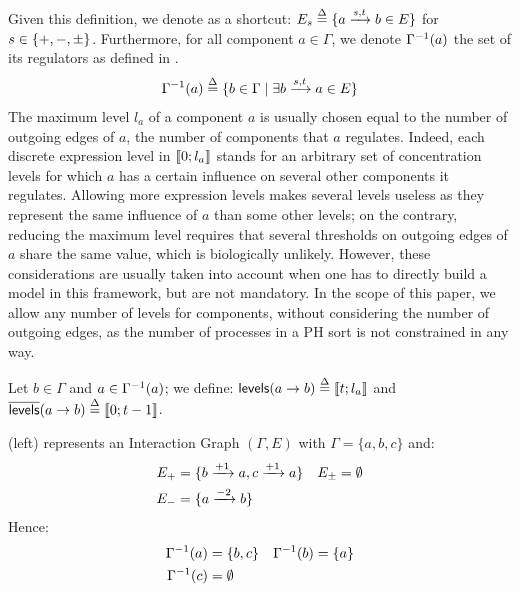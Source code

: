 Given this definition, we denote as a shortcut:
$E_s \stackrel{\Delta}= \{ a \xrightarrow{s, t} b \in E \}$ for $s \in \{ +, -, \pm \}$.
Furthermore, for all component $a \in \Gamma$, we denote $\Gamma^{-1}(a)$ the set of its regulators as defined in .
\begin{align}
\label{eq:grn-regulators}
  \Gamma^{-1}(a) \stackrel{\Delta}= \{ b\in\Gamma\mid \exists b \xrightarrow{s, t} a \in E \}
\end{align}
The maximum level $l_a$ of a component $a$ is usually chosen equal to the number of outgoing edges of $a$, \ie the number of components that $a$ regulates.
Indeed, each discrete expression level in $\llbracket 0 ; l_a \rrbracket$ stands for an arbitrary set of concentration levels for which $a$ has a certain influence on several other components it regulates.
Allowing more expression levels makes several levels useless as they represent the same influence of $a$ than some other levels;
on the contrary, reducing the maximum level requires that several thresholds on outgoing edges of $a$ share the same value, which is biologically unlikely.
However, these considerations are usually taken into account when one has to directly build a model in this framework, but are not mandatory.
In the scope of this paper, we allow any number of levels for components, without considering the number of outgoing edges,
as the number of processes in a PH sort is not constrained in any way.

\begin{definition}\label{def:levels}
Let $b \in \Gamma$ and $a \in \Gamma^{-1}(a)$;
we define: $\mathsf{levels}(a\rightarrow b) \stackrel{\Delta}= \llbracket t ; l_a \rrbracket$ and $\overline{\mathsf{levels}}(a\rightarrow b) \stackrel{\Delta}= \llbracket 0 ; t-1 \rrbracket$.
\end{definition}

\begin{example*}
(left) represents an Interaction Graph $(\Gamma,E)$ with
$\Gamma = \{a, b, c\}$ and:
\begin{align*}
  E_+ &= \{b \xrightarrow{+ 1} a, c \xrightarrow{+ 1} a\} &
  E_\pm &= \emptyset \\
  E_- &= \{a \xrightarrow{- 2} b\}
\end{align*}
Hence:
\begin{align*}
  \Gamma^{-1}(a) &= \{ b, c \} &
  \Gamma^{-1}(b) &= \{ a \} \\
  \Gamma^{-1}(c) &= \emptyset
\end{align*}
\end{example*}

